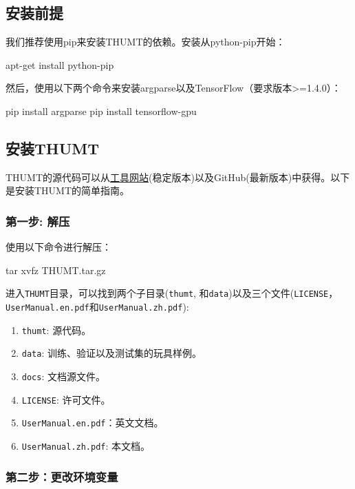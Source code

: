 \documentclass{article}
\begin{document}
\subsection{安装前提}
我们推荐使用pip来安装THUMT的依赖。安装从python-pip开始：

\begin{everbatim}
apt-get install python-pip
\end{everbatim}

然后，使用以下两个命令来安装argparse以及TensorFlow（要求版本>=1.4.0）：

\begin{everbatim}
pip install argparse
pip install tensorflow-gpu
\end{everbatim}

\subsection{安装THUMT}

THUMT的源代码可以从\href{http://thumt.thunlp.org}{工具网站}(稳定版本)以及GitHub(最新版本)中获得。以下是安装THUMT的简单指南。

\subsubsection{第一步: 解压}
使用以下命令进行解压：

\begin{everbatim}
tar xvfz THUMT.tar.gz
\end{everbatim}

进入\verb|THUMT|目录，可以找到两个子目录(\verb|thumt|, 和\verb|data|)以及三个文件(\verb|LICENSE|，\verb|UserManual.en.pdf|和\verb|UserManual.zh.pdf|):
\begin{enumerate}
\item \verb|thumt|: 源代码。
\item \verb|data|: 训练、验证以及测试集的玩具样例。
\item \verb|docs|: 文档源文件。
\item \verb|LICENSE|: 许可文件。
\item \verb|UserManual.en.pdf|：英文文档。
\item \verb|UserManual.zh.pdf|: 本文档。
\end{enumerate}


\subsubsection{第二步：更改环境变量}
\end{document}
